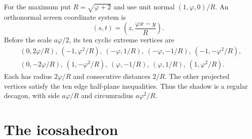 \documentclass[11pt,a4paper]{article}
\newcommand{\ph}{\varphi}
\begin{document}
For the maximum put $R=\sqrt{\ph+2}$ and use unit normal $(1,\ph,0)/R$. An orthonormal screen coordinate system is
\[
 (s,t)=\left(z,\frac{\ph x-y}{R}\right).
\]
Before the scale $a\ph/2$, its ten cyclic extreme vertices are
\begin{align*}
 &(0,2\ph/R),\ (-1,\ph^2/R),\ (-\ph,1/R),\ (-\ph,-1/R),\ (-1,-\ph^2/R),\\
 &(0,-2\ph/R),\ (1,-\ph^2/R),\ (\ph,-1/R),\ (\ph,1/R),\ (1,\ph^2/R).
\end{align*}
Each has radius $2\ph/R$ and consecutive distances $2/R$. The other projected vertices satisfy the ten edge half-plane inequalities. Thus the shadow is a regular decagon, with side $a\ph/R$ and circumradius $a\ph^2/R$.

\section{The icosahedron}\label{sec:ico}
\end{document}
